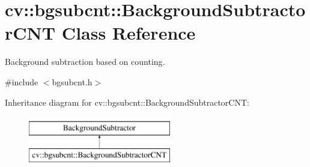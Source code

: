 \hypertarget{classcv_1_1bgsubcnt_1_1BackgroundSubtractorCNT}{}\section{cv\+:\+:bgsubcnt\+:\+:Background\+Subtractor\+C\+NT Class Reference}
\label{classcv_1_1bgsubcnt_1_1BackgroundSubtractorCNT}


Background subtraction based on counting.  




{\ttfamily \#include $<$bgsubcnt.\+h$>$}

Inheritance diagram for cv\+:\+:bgsubcnt\+:\+:Background\+Subtractor\+C\+NT\+:\begin{figure}[H]
\begin{center}
\leavevmode
\includegraphics[height=2.000000cm]{classcv_1_1bgsubcnt_1_1BackgroundSubtractorCNT}
\end{center}
\end{figure}
